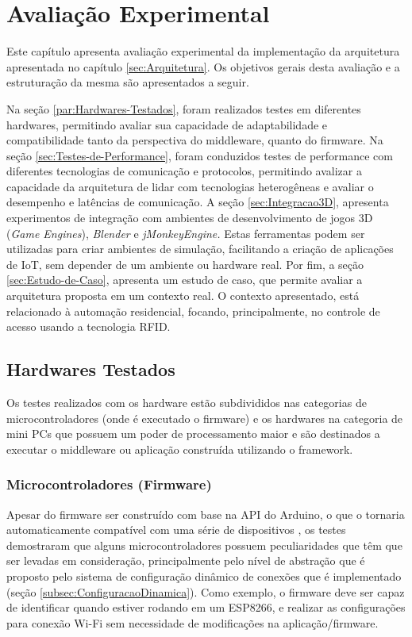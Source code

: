 
\chapter{Avaliação Experimental\label{sec:Avaliacao-Experimental}}

Este capítulo apresenta avaliação experimental da implementação da
arquitetura apresentada no capítulo \ref{sec:Arquitetura}. Os objetivos
gerais desta avaliação e a estruturação da mesma são apresentados
a seguir.

Na seção \ref{par:Hardwares-Testados}, foram realizados testes em
diferentes hardwares, permitindo avaliar sua capacidade de adaptabilidade
e compatibilidade tanto da perspectiva do middleware, quanto do firmware.
Na seção \ref{sec:Testes-de-Performance}, foram conduzidos testes
de performance com diferentes tecnologias de comunicação e protocolos,
permitindo avalizar a capacidade da arquitetura de lidar com tecnologias
heterogêneas e avaliar o desempenho e latências de comunicação. A
seção \ref{sec:Integracao3D}, apresenta experimentos de integração
com ambientes de desenvolvimento de jogos 3D (\emph{Game Engines}),
\emph{Blender} e \emph{jMonkeyEngine.} Estas ferramentas podem ser
utilizadas para criar ambientes de simulação, facilitando a criação
de aplicações de IoT, sem depender de um ambiente ou hardware real.
Por fim, a seção \ref{sec:Estudo-de-Caso}, apresenta um estudo de
caso, que permite avaliar a arquitetura proposta em um contexto real.
O contexto apresentado, está relacionado à automação residencial,
focando, principalmente, no controle de acesso usando a tecnologia
RFID.

\section{Hardwares Testados\label{par:Hardwares-Testados}}

Os testes realizados com os hardware estão subdivididos nas categorias
de microcontroladores (onde é executado o firmware) e os hardwares
na categoria de mini PCs que possuem um poder de processamento maior
e são destinados a executar o middleware ou aplicação construída utilizando
o framework.

\subsection{Microcontroladores (Firmware)}

Apesar do firmware ser construído com base na API do Arduino, o que
o tornaria automaticamente compatível com uma série de dispositivos
\cite{arduino-comp1,arduino-comp2,arduino-comp3}, os testes demostraram
que alguns microcontroladores possuem peculiaridades que têm que ser
levadas em consideração, principalmente pelo nível de abstração que
é proposto pelo sistema de configuração dinâmico de conexões que é
implementado (seção \ref{subsec:ConfiguracaoDinamica}). Como exemplo,
o firmware deve ser capaz de identificar quando estiver rodando em
um ESP8266, e realizar as configurações para conexão Wi-Fi sem necessidade
de modificações na aplicação/firmware.

